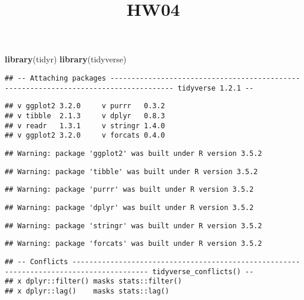 \documentclass[]{article}
\title{HW04}
\author{}
\date{}
\newenvironment{Shaded}{\begin{snugshade}}{\end{snugshade}}
\newcommand{\KeywordTok}[1]{\textcolor[rgb]{0.13,0.29,0.53}{\textbf{#1}}}
\newcommand{\NormalTok}[1]{#1}
\begin{document}
\maketitle

\begin{Shaded}
\begin{Highlighting}[]
\KeywordTok{library}\NormalTok{(tidyr)}
\KeywordTok{library}\NormalTok{(tidyverse)}
\end{Highlighting}
\end{Shaded}

\begin{verbatim}
## -- Attaching packages ------------------------------------------------------------------------------------- tidyverse 1.2.1 --
\end{verbatim}

\begin{verbatim}
## v ggplot2 3.2.0     v purrr   0.3.2
## v tibble  2.1.3     v dplyr   0.8.3
## v readr   1.3.1     v stringr 1.4.0
## v ggplot2 3.2.0     v forcats 0.4.0
\end{verbatim}

\begin{verbatim}
## Warning: package 'ggplot2' was built under R version 3.5.2
\end{verbatim}

\begin{verbatim}
## Warning: package 'tibble' was built under R version 3.5.2
\end{verbatim}

\begin{verbatim}
## Warning: package 'purrr' was built under R version 3.5.2
\end{verbatim}

\begin{verbatim}
## Warning: package 'dplyr' was built under R version 3.5.2
\end{verbatim}

\begin{verbatim}
## Warning: package 'stringr' was built under R version 3.5.2
\end{verbatim}

\begin{verbatim}
## Warning: package 'forcats' was built under R version 3.5.2
\end{verbatim}

\begin{verbatim}
## -- Conflicts ---------------------------------------------------------------------------------------- tidyverse_conflicts() --
## x dplyr::filter() masks stats::filter()
## x dplyr::lag()    masks stats::lag()
\end{verbatim}
\end{document}
